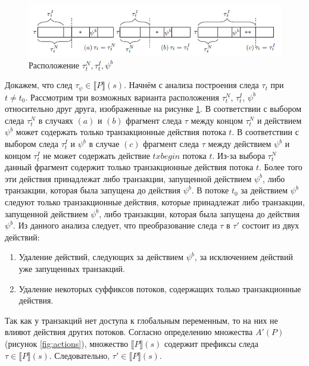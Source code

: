 \begin{myproof}
\begin{figure}
\centering
\includegraphics[width=\textwidth]{img/cases.png}
\caption{\label{fig:cases} Расположение $\tau^N_t, \tau^I_t, \psi^b$} 
\end{figure}
Докажем, что след $\tau_{\psi} \in \llbracket P \rrbracket (s)$. Начнём с анализа построения следа $\tau_t$ при $t \neq t_0$. Рассмотрим три возможных варианта расположения $\tau^N_t$, $\tau^I_t$, $\psi^b$ относительно друг друга, изображенные на рисунке \ref{fig:cases}. В соответствии с выбором следа $\tau^N_t$ в случаях $(a)$ и $(b)$ фрагмент следа $\tau$ между концом $\tau^N_t$ и действием $\psi^b$ может содержать только транзакционные действия потока $t$. В соответствии с выбором следа $\tau^I_t$ и $\psi^b$ в случае $(c)$ фрагмент следа $\tau$ между действием $\psi^b$ и концом $\tau^I_t$ не может содержать действие $txbegin$ потока $t$. Из-за выбора $\tau^N_t$ данный фрагмент содержит только транзакционные действия потока $t$. Более того эти действия принадлежат либо транзакции, запущенной действием $\psi^b$, либо транзакции, которая была запущена до действия $\psi^b$. В потоке $t_0$ за действием $\psi^b$ следуют только транзакционные действия, которые принадлежат либо транзакции, запущенной действием $\psi^b$, либо транзакции, которая была запущена до действия $\psi^b$. Из данного анализа следует, что преобразование следа $\tau$ в $\tau'$ состоит из двух действий:
\begin{enumerate}
\item Удаление действий, следующих за действием $\psi^b$, за исключением действий уже запущенных транзакций.
\item Удаление некоторых суффиксов потоков, содержащих только транзакционные действия. 
\end{enumerate}
Так как у транзакций нет доступа к глобальным переменным, то на них не влияют действия других потоков. Согласно определению множества $A'(P)$ (рисунок \ref{fig:actions}), множество $\llbracket P\rrbracket(s)$ содержит префиксы следа $\tau \in \llbracket P\rrbracket(s)$. Следовательно, $\tau' \in \llbracket P\rrbracket(s)$.


\end{myproof}
